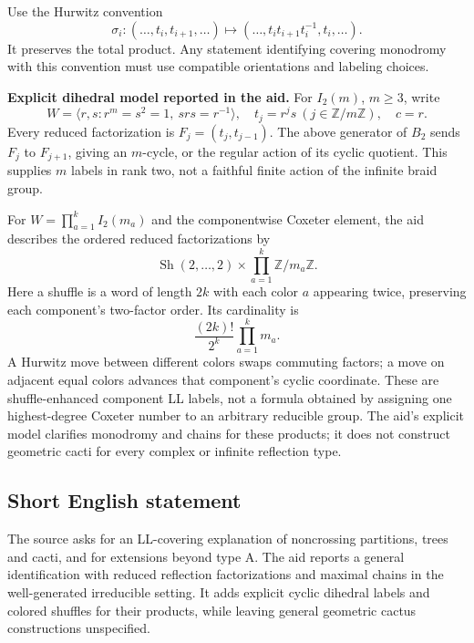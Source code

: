 \documentclass[11pt]{article}
\newcommand{\Z}{\mathbb{Z}}
\begin{document}
Use the Hurwitz convention
\[
 \sigma_i:(\ldots,t_i,t_{i+1},\ldots)
 \longmapsto(\ldots,t_it_{i+1}t_i^{-1},t_i,\ldots).
\]
It preserves the total product. Any statement identifying covering monodromy with this convention must use compatible orientations and labeling choices.

\textbf{Explicit dihedral model reported in the aid.} For \(I_2(m)\), \(m\ge3\), write
\[
 W=\langle r,s:r^m=s^2=1,\ srs=r^{-1}\rangle,\quad
 t_j=r^js\ (j\in\Z/m\Z),\quad c=r.
\]
Every reduced factorization is \(F_j=(t_j,t_{j-1})\). The above generator of \(B_2\) sends \(F_j\) to \(F_{j+1}\), giving an \(m\)-cycle, or the regular action of its cyclic quotient. This supplies \(m\) labels in rank two, not a faithful finite action of the infinite braid group.

For \(W=\prod_{a=1}^k I_2(m_a)\) and the componentwise Coxeter element, the aid describes the ordered reduced factorizations by
\[
 \operatorname{Sh}(2,\ldots,2)\times
                  \prod_{a=1}^k\Z/m_a\Z.
\]
Here a shuffle is a word of length \(2k\) with each color \(a\) appearing twice, preserving each component's two-factor order. Its cardinality is
\[
 \frac{(2k)!}{2^k}\prod_{a=1}^k m_a.
\]
A Hurwitz move between different colors swaps commuting factors; a move on adjacent equal colors advances that component's cyclic coordinate. These are shuffle-enhanced component LL labels, not a formula obtained by assigning one highest-degree Coxeter number to an arbitrary reducible group. The aid's explicit model clarifies monodromy and chains for these products; it does not construct geometric cacti for every complex or infinite reflection type.
\subsection{Short English statement}
The source asks for an LL-covering explanation of noncrossing partitions, trees and cacti, and for extensions beyond type A. The aid reports a general identification with reduced reflection factorizations and maximal chains in the well-generated irreducible setting. It adds explicit cyclic dihedral labels and colored shuffles for their products, while leaving general geometric cactus constructions unspecified.
\end{document}
